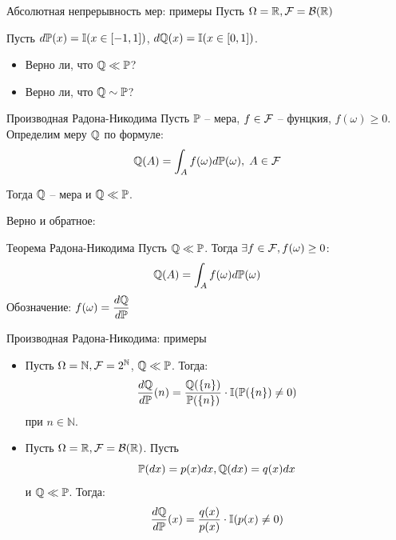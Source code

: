 \documentclass{beamer}
\begin{document}
\begin{frame}{Абсолютная непрерывность мер: примеры}
    Пусть $\Omega=\mathbb{R}, \mathcal{F} = \mathcal{B}(\mathbb{R})$

    Пусть $d\mathbb{P}(x)= \mathbb{I}(x \in [-1, 1])$, $d\mathbb{Q}(x) = \mathbb{I}(x \in [0, 1])$.

    \begin{itemize}
        \item Верно ли, что $\mathbb{Q} \ll \mathbb{P}$?
        \item Верно ли, что $\mathbb{Q} \sim \mathbb{P}$?
    \end{itemize}
\end{frame}

\begin{frame}{Производная Радона-Никодима}
    Пусть $\mathbb{P}$ -- мера, $f \in \mathcal{F}$ -- фунцкия, $f(\omega)\geq 0$. Определим меру $\mathbb{Q}$ по формуле:
    $$
        \mathbb{Q}(A) = \int_A f(\omega) d\mathbb{P}(\omega), \; A \in \mathcal{F}
    $$
    
    Тогда $\mathbb{Q}$ -- мера и $\mathbb{Q} \ll \mathbb{P}$. 
    
    Верно и обратное:
    \begin{block}{Теорема Радона-Никодима}
        Пусть $\mathbb{Q} \ll \mathbb{P}$. Тогда $\exists f \in \mathcal{F}, f(\omega) \geq 0$:
        $$
            \mathbb{Q}(A) = \int_A f(\omega) d\mathbb{P}(\omega)
        $$Обозначение: $f(\omega) = \dfrac{d\mathbb{Q}}{d\mathbb{P}}$
    \end{block}
\end{frame}

\begin{frame}{Производная Радона-Никодима: примеры}
    \begin{itemize}
        \item     Пусть $\Omega = \mathbb{N}, \mathcal{F}=2^{\mathbb{N}}$, $\mathbb{Q} \ll \mathbb{P}$.
        Тогда:
    $$
         \dfrac{d\mathbb{Q}}{d\mathbb{P}}(n) = \dfrac{\mathbb{Q}(\{n\})}{\mathbb{P}(\{n\})} \cdot \mathbb{I}(\mathbb{P}(\{n\}) \neq 0)
    $$при $n \in \mathbb{N}$.

\item     Пусть $\Omega=\mathbb{R}, \mathcal{F} = \mathcal{B}(\mathbb{R})$. Пусть 
    $$\mathbb{P}(dx) = p(x)dx, \mathbb{Q}(dx) = q(x) dx$$ и $\mathbb{Q} \ll \mathbb{P}$. Тогда:
    $$
        \dfrac{d\mathbb{Q}}{d\mathbb{P}}(x) = \dfrac{q(x)}{p(x)} \cdot \mathbb{I}(p(x) \neq 0)
    $$
    \end{itemize}
\end{frame}
\end{document}

